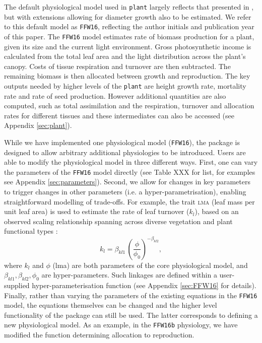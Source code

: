 \documentclass[a4paper,11pt]{article}
\newcommand{\plant}{\texttt{plant}}
\begin{document}
The default physiological model used in {\plant} largely reflects
that presented in \citet{Falster-2011,Falster-2015}, but with extensions
allowing for diameter growth also to be estimated. We refer to this
default model as \texttt{FFW16}, reflecting the author initials and
publication year of this paper. The \texttt{FFW16} model estimates rate
of biomass
production for a plant, given its size and the current light
environment. Gross photosynthetic income is calculated from the total
leaf area and the light distribution across the plant's canopy. Costs
of tissue respiration and turnover are then subtracted. The remaining
biomass is then allocated between growth and reproduction. The key
outputs needed by higher levels of the {\plant} are height
growth rate, mortality rate and rate of seed production.  However
additional quantities are also computed, such as total assimilation
and the respiration, turnover and allocation rates for different
tissues and these intermediates can also be accessed (see Appendix
\ref{sec:plant}).

While we have implemented one physiological model (\texttt{FFW16}), the
package is designed to allow arbitrary additional physiologies to be
introduced. Users are able to modify the physiological model in three
different ways. First, one can vary the parameters of the \texttt{FFW16} model
directly (see Table XXX for list, for examples see Appendix
\ref{sec:parameters}). Second, we allow for changes in key parameters to
trigger changes in other parameters (i.e. a hyper-parametrisation), enabling
straightforward modelling of trade-offs. For example, the trait \textsc{lma}
(leaf mass per unit leaf area) is used to estimate the rate of leaf turnover
($k_l$), based on an observed scaling relationship spanning across diverse
vegetation and plant functional types \citep{Wright-2004}:
$$k_l = \beta_{kl1} \, \left(\frac{\phi}{\phi_0}\right)^{-\beta_{kl2}},$$ 
where $k_l$ and $\phi$ (lma) are both parameters of the core physiological
model, and $\beta_{kl1}, \beta_{kl2}, \phi_0$ are hyper-parameters. Such
linkages are defined within a user-supplied hyper-parameterisation function
(see Appendix \ref{sec:FFW16} for details). Finally, rather than varying the
parameters of the existing equations in the \texttt{FFW16} model, the
equations themselves can be changed and the higher level functionality of the
package can still be used.  The latter corresponds to defining a new
physiological model. As an example, in the \texttt{FFW16b} physiology, we have modified
the function determining allocation to reproduction.
\end{document}
